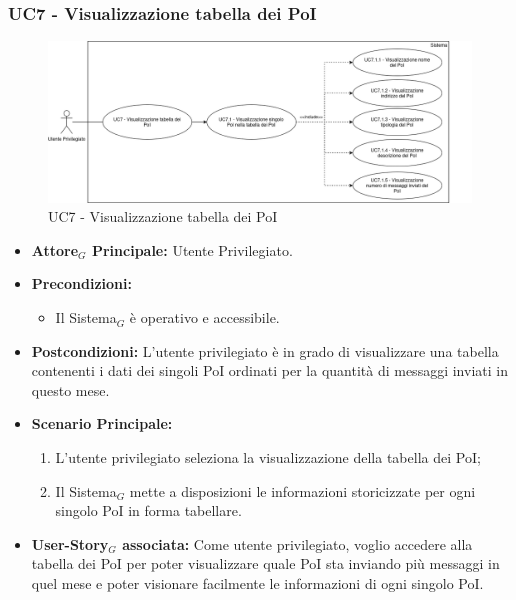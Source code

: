 \documentclass[10pt]{article}
\begin{document}
\begin{justify}
\subsubsection{\textbf{UC7 - Visualizzazione tabella dei PoI}}
\begin{figure}[H]
    \centering
    \includegraphics[width=0.7\linewidth]{UC7image.png}
    \caption{UC7 - Visualizzazione tabella dei PoI}
    \label{fig:UC7}
\end{figure}
\label{UC7}
\begin{itemize}
    \item \textbf{Attore$_G$ Principale:} Utente Privilegiato.
    \item \textbf{Precondizioni:} 
        \begin{itemize}
          \item Il Sistema$_G$ è operativo e accessibile.
        \end{itemize}
      \item \textbf{Postcondizioni:} L'utente privilegiato è in grado di visualizzare una tabella contenenti i dati dei singoli PoI ordinati per la quantità di messaggi inviati in questo mese.\\
    \item \textbf{Scenario Principale:} 
        \begin{enumerate}
        \item L'utente privilegiato seleziona la visualizzazione della tabella dei PoI;
          \item Il Sistema$_G$ mette a disposizioni le informazioni storicizzate per ogni singolo PoI in forma tabellare.
        \end{enumerate}
    \item \textbf{User-Story$_G$ associata:} Come utente privilegiato, voglio accedere alla tabella dei PoI per poter visualizzare quale PoI sta inviando più messaggi in quel mese e poter visionare facilmente le informazioni di ogni singolo PoI.
\end{itemize}


\end{justify}
\end{document}
